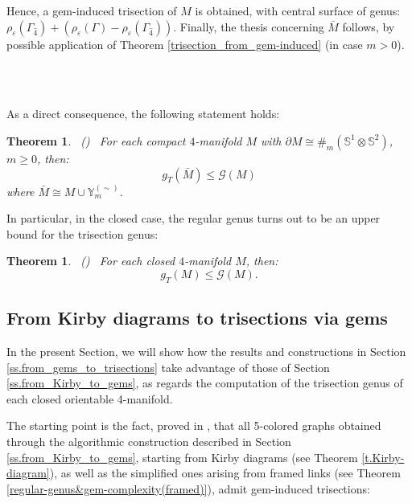 \documentclass[12pt,a4paper]{article}
\newtheorem{theorem}[lemma]{Theorem}
\newcommand{\qed}{\\ \rightline{$\Box$ \ \ \ \ \ \ \ \ \ \ \ \ \ \ \ }\\}
\begin{document}
Hence, a gem-induced trisection of $M$ is obtained, with central surface of genus:  $\rho_\varepsilon(\Gamma_{\hat 4}) + (\rho_\varepsilon(\Gamma) - \rho_\varepsilon(\Gamma_{\hat 4}))$. Finally, the thesis concerning $\bar M$ follows, by possible 
application of Theorem \ref{trisection_from_gem-induced} (in  case $m>0$). 

\ \qed 

\medskip

As a direct consequence, the following statement holds:

\begin{theorem}\label{trisection_vs_regular-genus} \ {\rm (\cite{Casali-Cristofori trisection ter})} \ 
For each compact $4$-manifold $M$ with $\partial M \cong \#_m(\mathbb S^1 \otimes \mathbb S^2)$, $m \ge 0$,    then: 
$$g_T(\bar M) \le \mathcal G(M)$$
where $\bar M \cong M \cup {\mathbb Y}_m^{(\sim)}$.   
\end{theorem}

\medskip

In particular, in the closed case, the regular genus turns out to be an upper bound for the trisection genus: 

\begin{theorem}\label{trisection_vs_regular-genus(closed case)} \ {\rm (\cite{Casali-Cristofori trisection ter})} \ 
For each closed $4$-manifold $M$,  then: 
$$g_T(M) \le \mathcal G(M).$$
\end{theorem}

\medskip

\subsection{From Kirby diagrams to trisections via gems} 
\label{ss.from_Kirby_to_trisections}
\par \noindent

In the present Section, we will show how the results and constructions in Section   \ref{ss.from_gems_to_trisections} take advantage of those of Section \ref{ss.from_Kirby_to_gems}, as regards the computation of the trisection genus of each closed orientable 4-manifold. 

\medskip

The starting point is the fact, proved in \cite{Casali-Cristofori gem-induced}, that all 5-colored graphs obtained through the algorithmic construction described in Section \ref{ss.from_Kirby_to_gems}, starting from Kirby diagrams (see Theorem \ref{t.Kirby-diagram}), as well as the simplified ones arising from framed links (see Theorem \ref{regular-genus&gem-complexity(framed)}), admit gem-induced trisections:  
\end{document}
